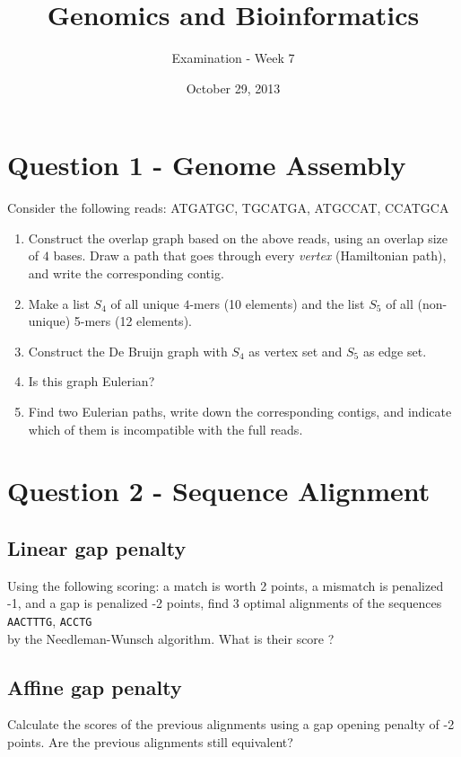 \documentclass[a4paper,11pt]{article}
\title{Genomics and Bioinformatics}
\date{October 29, 2013}
\author{Examination - Week 7}
\begin{document}
\maketitle

\section*{Question 1 - Genome Assembly}

Consider the following reads:
ATGATGC, TGCATGA, ATGCCAT, CCATGCA

\begin{enumerate}
\item Construct the overlap graph based on the above reads, using an
  overlap size of $4$ bases.
  Draw a path that goes
  through every \emph{vertex} (Hamiltonian path), and write the
  corresponding contig. 
\item Make a list $S_4$ of all unique $4$-mers (10 elements) and the
  list $S_5$ of all (non-unique) 5-mers (12 elements). 
\item Construct the De Bruijn graph with $S_4$ as vertex set and
  $S_5$ as edge set.
\item Is this graph Eulerian?
\item Find two Eulerian paths, write down the corresponding contigs,
  and indicate which of them is incompatible with the full reads.
\end{enumerate}


\section*{Question 2 - Sequence Alignment}

\subsection*{Linear gap penalty}
Using the following scoring: a match is worth 2 points, a mismatch is penalized -1,
and a gap is penalized -2 points, find 3 optimal alignments of the sequences\\
\texttt{AACTTTG}, \texttt{ACCTG}\\
by the Needleman-Wunsch algorithm. What is their score ? 


\subsection*{Affine gap penalty}

Calculate the scores of the previous alignments using a gap opening penalty of -2 points. 
Are the previous alignments still equivalent?
\end{document}
